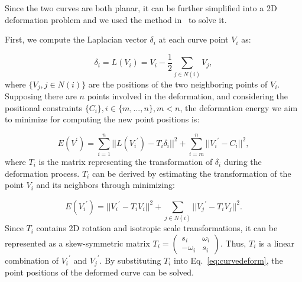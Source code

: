 Since the two curves are both planar, it can be further simplified
into a 2D deformation problem and we used the method in~\cite{ESA07}
to solve it.

First, we compute the Laplacian vector $\delta_i$ at each curve point $V_i$
as:

\begin{equation}
\label{eq:curveLap}
 \delta_i=L(V_i)=V_i- \frac{1}{2} \sum\limits_{j \in N(i)} {V_j},
\end{equation}
where $\{V_j, j\in N(i)\}$ are the positions of the two neighboring
points of $V_i$. Supposing there are $n$ points involved in the
deformation,  and considering the positional constraints
$\{C_i\},i\in\{m,...,n\},m<n$, the deformation energy we aim to
minimize for computing the new point positions is:

\begin{equation}
\label{eq:curvedeform}
    E(V^\prime)=\sum\limits_{i=1}^n{||L({V_i}^\prime)-T_i\delta_i||^2}
    +\sum\limits_{i=m}^n{||{V_i}^\prime-C_i||^2},
\end{equation}
where $T_i$ is the matrix representing the transformation of $\delta_i$
during the deformation process. $T_i$ can be derived by estimating the
transformation of the point $V_i$ and its neighbors through minimizing:

\begin{equation}
\label{eq:curveLapTi}
    E({V_i}^\prime)=||{V_i}^\prime-T_iV_i||^2 +
    \sum\limits_{j \in N(i)}{||{V_j}^\prime-T_iV_j||^2}.
\end{equation}
Since $T_i$ contains 2D rotation and isotropic scale transformations,
it can be represented as a skew-symmetric matrix
$T_i= \begin{pmatrix} s_i & \omega_i \\ -\omega_i & s_i \end{pmatrix}$.
Thus, $T_i$ is a linear combination of ${V_i}^\prime$
and ${V_j}^\prime$. By substituting $T_i$ into Eq.~\ref{eq:curvedeform},
the point positions of the deformed curve can be solved.




